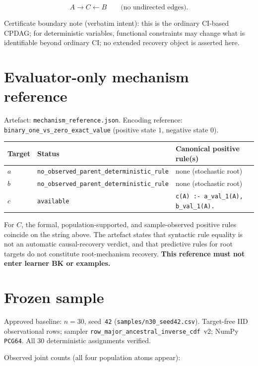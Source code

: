\documentclass[11pt]{article}
\begin{document}
\[
A \rightarrow C \leftarrow B
\qquad\text{(no undirected edges).}
\]

Certificate boundary note (verbatim intent): this is the ordinary CI-based CPDAG;
for deterministic variables, functional constraints may change what is identifiable
beyond ordinary CI; no extended recovery object is asserted here.

\section{Evaluator-only mechanism reference}

Artefact:
\texttt{mechanism\_reference.json}.
Encoding reference: \texttt{binary\_one\_vs\_zero\_exact\_value}
(positive state \(1\), negative state \(0\)).

\begin{center}
\begin{tabular}{@{}llp{}@{}}
\toprule
Target & Status & Canonical positive rule(s) \\
\midrule
\(a\) & \texttt{no\_observed\_parent\_deterministic\_rule} &
none (stochastic root) \\
\(b\) & \texttt{no\_observed\_parent\_deterministic\_rule} &
none (stochastic root) \\
\(c\) & \texttt{available} &
\texttt{c(A) :- a\_val\_1(A), b\_val\_1(A).} \\
\bottomrule
\end{tabular}
\end{center}

For \(C\), the formal, population-supported, and sample-observed positive rules
coincide on the string above. The artefact states that syntactic rule equality is
not an automatic causal-recovery verdict, and that predictive rules for root
targets do not constitute root-mechanism recovery.
\textbf{This reference must not enter learner BK or examples.}

\section{Frozen sample}

Approved baseline: \(n{=}30\), seed~\texttt{42}
(\texttt{samples/n30\_seed42.csv}).
Target-free IID observational rows; sampler
\texttt{row\_major\_ancestral\_inverse\_cdf}~v2; NumPy \texttt{PCG64}.
All \(30\) deterministic assignments verified.

Observed joint counts (all four population atoms appear):
\end{document}
